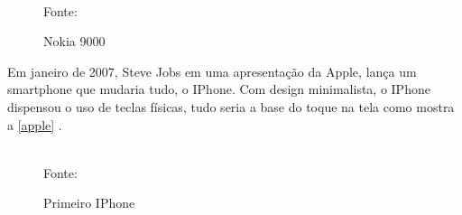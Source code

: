 \begin{figure}[!htpb]
	\centering
	\caption{Nokia 9000}
	\\
	{\footnotesize Fonte: \cite{nokia_9000}}
	\label{nokia9}
\end{figure}

\newpage
Em janeiro de 2007, Steve Jobs em uma apresentação da Apple, lança um smartphone que mudaria tudo, o IPhone. Com design minimalista, o IPhone dispensou o uso de teclas físicas, tudo seria a base do toque na tela como mostra a \autoref{apple} \cite{historia_mobile2}.

\begin{figure}[!htpb]
	\centering
	\caption{Primeiro IPhone}
	\\
	{\footnotesize Fonte: \cite{historia_mobile}}
	\label{apple}
\end{figure}

